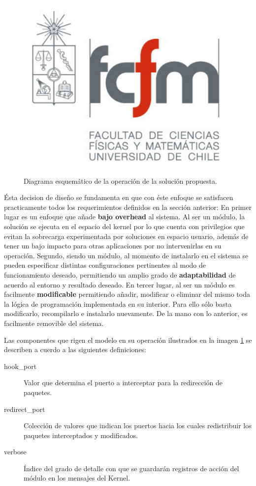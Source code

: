 	\begin{figure}[!h]
		\centering
		\includegraphics[scale=.2]{imagenes/fcfm}
		\caption{Diagrama esquemático de la operación de la solución propuesta.}
		\label{fig:modeloUDPRedistribuyeModule}
	\end{figure}

Ésta decision de diseño se fundamenta en que con éste enfoque se satisfacen practicamente todos los requerimientos definidos en la sección anterior: En primer lugar es un enfoque que añade \textbf{bajo overhead} al sistema. Al ser un módulo, la solución se ejecuta en el espacio del kernel por lo que cuenta con privilegios que evitan la sobrecarga experimentada por soluciones en espacio usuario, además de tener un bajo impacto para otras aplicaciones por no intervenirlas en su operación. Segundo, siendo un módulo, al momento de instalarlo en el sistema se pueden especificar distintas configuraciones pertinentes al modo de funcionamiento deseado, permitiendo un amplio grado de \textbf{adaptabilidad} de acuerdo al entorno y resultado deseado. En tercer lugar, al ser un módulo es facilmente \textbf{modificable} permitiendo añadir, modificar o eliminar del mismo toda la lógica de programación implementada en su interior. Para ello sólo basta modificarlo, recompilarlo e instalarlo nuevamente. De la mano con lo anterior, es facilmente removible del sistema.

Las componentes que rigen el modelo en su operación ilustrados en la imagen \ref{fig:modeloUDPRedistribuyeModule} se describen a cuerdo a las siguientes definiciones:

\begin{description}
\item[hook\_port] Valor que determina el puerto a interceptar para la redirección de paquetes.
\item[redirect\_port] Colección de valores que indican los puertos hacia los cuales redistribuir los paquetes interceptados y modificados.
\item[verbose] Índice del grado de detalle con que se guardarán registros de acción del módulo en los mensajes del Kernel.
\end{description}

